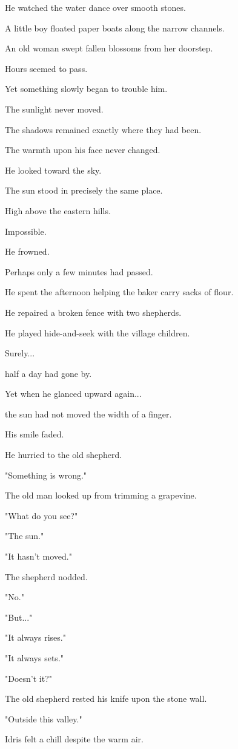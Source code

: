 \documentclass[12pt,openany]{book}
\begin{document}
He watched the water dance over smooth stones.

A little boy floated paper boats along the narrow channels.

An old woman swept fallen blossoms from her doorstep.

Hours seemed to pass.

Yet something slowly began to trouble him.

The sunlight never moved.

The shadows remained exactly where they had been.

The warmth upon his face never changed.

He looked toward the sky.

The sun stood in precisely the same place.

High above the eastern hills.

Impossible.

He frowned.

Perhaps only a few minutes had passed.

He spent the afternoon helping the baker carry sacks of flour.

He repaired a broken fence with two shepherds.

He played hide-and-seek with the village children.

Surely...

half a day had gone by.

Yet when he glanced upward again...

the sun had not moved the width of a finger.

His smile faded.

He hurried to the old shepherd.

"Something is wrong."

The old man looked up from trimming a grapevine.

"What do you see?"

"The sun."

"It hasn't moved."

The shepherd nodded.

"No."

"But..."

"It always rises."

"It always sets."

"Doesn't it?"

The old shepherd rested his knife upon the stone wall.

"Outside this valley."

Idris felt a chill despite the warm air.
\end{document}
